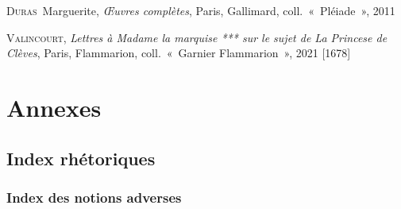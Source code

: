 \documentclass[12pt, a4paper]{article}
\begin{document}
	\textsc{Duras}~Marguerite, \textit{Œuvres complètes}, Paris, Gallimard, coll.~«~Pléiade~», 2011\par 
	\textsc{Valincourt}, \textit{Lettres à Madame la marquise *** sur le sujet de La Princese de Clèves}, Paris, Flammarion, coll.~«~Garnier Flammarion~», 2021 [1678]\par 
		
		  
\newpage

\section{Annexes}

\subsection{Index rhétoriques}
\label{gloss}
\subsubsection{Index des notions adverses}
\end{document}
